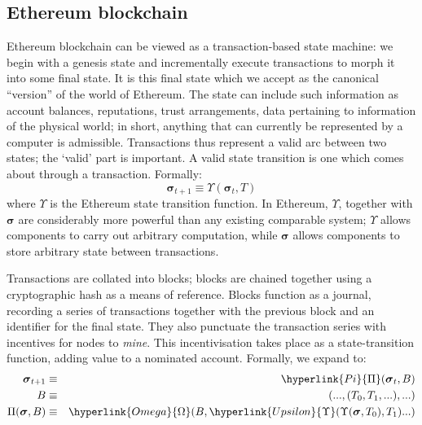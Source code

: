 \documentclass{isprs} %
\begin{document}
\sloppy

\subsection{Ethereum blockchain}\label{sec:Ethereum blockchain}

Ethereum blockchain can be viewed as a transaction-based state machine: we begin with a genesis state and incrementally execute transactions to morph it into some final state. It is this final state which we accept as the canonical “version” of the world of Ethereum. The state can include such information as account balances, reputations, trust arrangements, data pertaining to information of the physical world; in short, anything that can currently be represented by a computer is admissible. Transactions thus represent a valid arc between two states; the ‘valid’ part is important. A valid state transition is one which comes about through a transaction. Formally:
\begin{equation}
\boldsymbol{\sigma}_{t+1} \equiv \Upsilon(\boldsymbol{\sigma}_{t}, T)
\end{equation}
where $\Upsilon$ is the Ethereum state transition function. In Ethereum, $\Upsilon$, together with $\boldsymbol{\sigma}$ are considerably more powerful than any existing comparable system; $\Upsilon$ allows components to carry out arbitrary computation, while $\boldsymbol{\sigma}$ allows components to store arbitrary state between transactions.

Transactions are collated into blocks; blocks are chained together using a cryptographic hash as a means of reference. Blocks function as a journal, recording a series of transactions together with the previous block and an identifier for the final state. They also punctuate the transaction series with incentives for nodes to \textit{mine}. This incentivisation takes place as a state-transition function, adding value to a nominated account. Formally, we expand to:
\begin{eqnarray}
\boldsymbol{\sigma}_{t+1} & \equiv & \hyperlink{Pi}{\Pi}(\boldsymbol{\sigma}_{t}, B) \\
B & \equiv & (..., (T_0, T_1, ...), ...) \\
\Pi(\boldsymbol{\sigma}, B) & \equiv & \hyperlink{Omega}{\Omega}(B, \hyperlink{Upsilon}{\Upsilon}(\Upsilon(\boldsymbol{\sigma}, T_0), T_1) ...)
\end{eqnarray}
\end{document}
